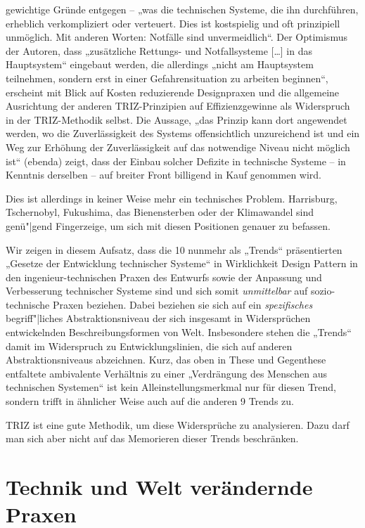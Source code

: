 \documentclass[11pt,a4paper]{article}
\begin{document}
gewichtige Gründe entgegen -- „was die technischen Systeme, die ihn
durchführen, erheblich verkompliziert oder verteuert. Dies ist kostspielig und
oft prinzipiell unmöglich. Mit anderen Worten: Notfälle sind unvermeidlich“.
Der Optimismus der Autoren, dass „zusätzliche Rettungs- und Notfallsysteme
[\ldots] in das Hauptsystem“ eingebaut werden, die allerdings „nicht am
Hauptsystem teilnehmen, sondern erst in einer Gefahrensituation zu arbeiten
beginnen“, erscheint mit Blick auf Kosten reduzierende Designpraxen und die
allgemeine Ausrichtung der anderen TRIZ-Prinzipien auf Effizienzgewinne als
Widerspruch in der TRIZ-Methodik selbst. Die Aussage, „das Prinzip kann dort
angewendet werden, wo die Zuverlässigkeit des Systems offensichtlich
unzureichend ist und ein Weg zur Erhöhung der Zuverlässigkeit auf das
notwendige Niveau nicht möglich ist“ (ebenda) zeigt, dass der Einbau solcher
Defizite in technische Systeme -- in Kenntnis derselben -- auf breiter Front
billigend in Kauf genommen wird.

Dies ist allerdings in keiner Weise mehr ein technisches Problem.  Harrisburg,
Tschernobyl, Fukushima, das Bienensterben \cite{Jacobasch2019} oder der
Klimawandel sind genü"|gend Fingerzeige, um sich mit diesen Positionen genauer
zu befassen.

Wir zeigen in diesem Aufsatz, dass die 10 nunmehr als „Trends“ präsentierten
„Gesetze der Entwicklung technischer Systeme“ in Wirklichkeit Design Pattern
in den ingenieur-technischen Praxen des Entwurfs sowie der Anpassung und
Verbesserung technischer Systeme sind und sich somit \emph{unmittelbar} auf
sozio-technische Praxen beziehen. Dabei beziehen sie sich auf ein
\emph{spezifisches} begriff"|liches Abstraktionsniveau der sich insgesamt in
Widersprüchen entwickelnden Beschreibungsformen von Welt. Insbesondere stehen
die „Trends“ damit im Widerspruch zu Entwicklungslinien, die sich auf anderen
Abstraktionsniveaus abzeichnen. Kurz, das oben in These und Gegenthese
entfaltete ambivalente Verhältnis zu einer „Verdrängung des Menschen aus
technischen Systemen“ ist kein Alleinstellungsmerkmal nur für diesen Trend,
sondern trifft in ähnlicher Weise auch auf die anderen 9 Trends zu.

TRIZ ist eine gute Methodik, um diese Widersprüche zu analysieren. Dazu darf
man sich aber nicht auf das Memorieren dieser Trends beschränken.  

\section{Technik und Welt verändernde Praxen}
\end{document}
